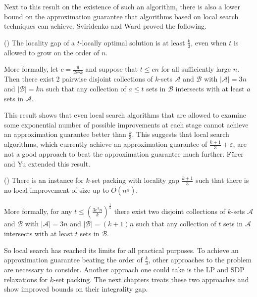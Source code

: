 Next to this result on the existence of such an algorithm, there is also a lower bound on the approximation guarantee that algorithms based on local search techniques can achieve. %
Sviridenko and Ward \cite{Sviridenko} proved the following.
%
\begin{theorem}\label{thm:HardnessSviridenko}
(\cite[Theorem 6.1]{Sviridenko}) The locality gap of a $t$-locally optimal solution is at least $\frac{k}{3}$, even when $t$ is allowed to grow on the order of $n$.

More formally, let $c = \frac{9}{2e^5k}$ and suppose that $t \leq cn$ for all sufficiently large $n$. Then there exist 2 pairwise disjoint collections of $k$-sets $\mathcal{A}$ and $\mathcal{B}$ with $|\mathcal{A}| = 3n$ and $|\mathcal{B}| = kn$ such that any collection of $a \leq t$ sets in $\mathcal{B}$ intersects with at least $a$ sets in $\mathcal{A}$.
\end{theorem}
%
This result shows that even local search algorithms that are allowed to examine some exponential number of possible improvements at each stage cannot achieve an approximation guarantee better than $\frac{k}{3}$. This suggests that local search algorithms, which currently achieve an approximation guarantee of $\frac{k+1}{3} + \varepsilon$, are not a good approach to beat the approximation guarantee much further. F\"{u}rer and Yu \cite{FurerYu} extended this result. %
%
\begin{theorem}\label{thm:HardnessFurerYu}
(\cite[Theorem 7]{FurerYu}) There is an instance for $k$-set packing with locality gap $\frac{k+1}{3}$ such that there is no local improvement of size up to $O(n^{\frac{1}{5}})$.

More formally, for any $t \leq \left( \frac{3 e^3 n}{k} \right)^\frac{1}{5}$ there exist two disjoint collections of $k$-sets $\mathcal{A}$ and $\mathcal{B}$ with $|\mathcal{A}| = 3n$ and $|\mathcal{B}| = (k+1)n$ such that any collection of $t$ sets in $\mathcal{A}$ intersects with at least $t$ sets in $\mathcal{B}$.
\end{theorem}
%
So local search has reached its limits for all practical purposes. To achieve an approximation guarantee beating the order of $\frac{k}{3}$, other approaches to the problem are necessary to consider. Another approach one could take is the LP and SDP relaxations for $k$-set packing. The next chapters treats these two approaches and show improved bounds on their integrality gap. 